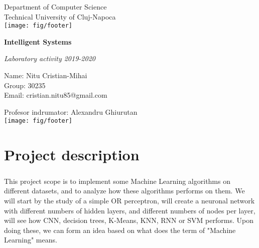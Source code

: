 \documentclass[a4paper,12pt]{report}
\begin{document}
\vspace{-5cm}
\begin{center}
Department of Computer Science\\
Technical University of Cluj-Napoca\\
\texttt{[image: fig/footer]}
\end{center}
\vspace{1cm}
\begin{center}
\begin{Large}
\textbf{Intelligent Systems}\\
\end{Large}
\textit{Laboratory activity 2019-2020}\\
\vspace{3cm}

Name: Nitu Cristian-Mihai\\
Group: 30235\\
Email: cristian.nitu85@gmail.com\\
\vspace{6cm}

Profesor indrumator: Alexandru Ghiurutan\\

\vspace{1cm}
\texttt{[image: fig/footer]}
\end{center}

\tableofcontents

\chapter{Project description}

\paragraph{} 
This project scope is to implement some Machine Learning algorithms on different datasets, and to analyze how these algorithms performs on them. We will start by the study of a simple OR perceptron, will create a neuronal network with different numbers of hidden layers, and different numbers of nodes per layer, will see how CNN, decision trees, K-Means, KNN, RNN or SVM performs. Upon doing these, we can form an idea based on what does the term of "Machine Learning" means.
\end{document}
